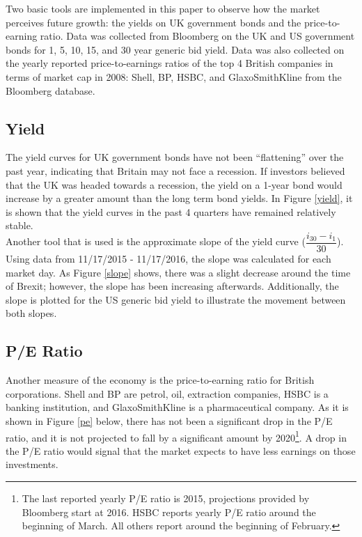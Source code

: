 \documentclass[12pt]{article}
\begin{document}
Two basic tools are implemented in this paper to observe how the market perceives future growth: the yields on UK government bonds and the price-to-earning ratio. Data was collected from Bloomberg on the UK and US government bonds for 1, 5, 10, 15, and 30 year generic bid yield. Data was also collected on the yearly reported price-to-earnings ratios of the top 4 British companies in terms of market cap in 2008: Shell, BP, HSBC, and GlaxoSmithKline from the Bloomberg database.  
\subsection{Yield}
The yield curves for UK government bonds have not been ``flattening'' over the past year, indicating that Britain may not face a recession. If investors believed that the UK was headed towards a recession, the yield on a 1-year bond would increase by a greater amount than the long term bond yields. In Figure \ref{yield}, it is shown that the yield curves in the past 4 quarters have remained relatively stable.\\

Another tool that is used is the approximate slope of the yield curve ($\dfrac{i_{30}-i_{1}}{30}$). Using data from 11/17/2015 - 11/17/2016, the slope was calculated for each market day. As Figure \ref{slope} shows, there was a slight decrease around the time of Brexit; however, the slope has been increasing afterwards. Additionally, the slope is plotted for the US generic bid yield to illustrate the movement between both slopes.


\subsection{P/E Ratio}
Another measure of the economy is the price-to-earning ratio for British corporations. Shell and BP are petrol, oil, extraction companies, HSBC is a banking institution, and GlaxoSmithKline is a pharmaceutical company. As it is shown in Figure \ref{pe} below, there has not been a significant drop in the P/E ratio, and it is not projected to fall by a significant amount by 2020\footnote{The last reported yearly P/E ratio is 2015, projections provided by Bloomberg start at 2016. HSBC reports yearly P/E ratio around the beginning of March. All others report around the beginning of February.}. A drop in the P/E ratio would signal that the market expects to have less earnings on those investments. 
\end{document}
